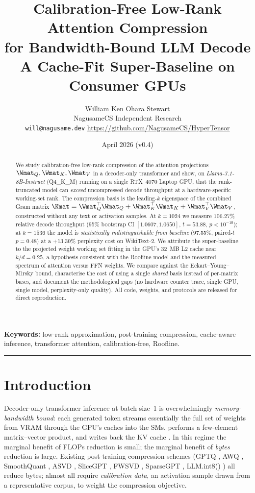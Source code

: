 \documentclass[11pt]{article}
\title{\textbf{Calibration-Free Low-Rank Attention Compression\\
for Bandwidth-Bound LLM Decode}\\[0.4em]
\large A Cache-Fit Super-Baseline on Consumer GPUs}
\author{William Ken Ohara Stewart\\
\small NagusameCS Independent Research\\
\small \texttt{will@nagusame.dev} \quad \url{https://github.com/NagusameCS/HyperTensor}}
\date{April 2026 (v0.4)}
\begin{document}
\maketitle
\hypertensorbanner

\begin{abstract}
\noindent
We study calibration-free low-rank compression of the attention projections
$\Wmat_Q,\Wmat_K,\Wmat_V$ in a decoder-only transformer and show, on
\textit{Llama-3.1-8B-Instruct} (Q4\_K\_M) running on a single RTX~4070 Laptop
GPU, that the rank-truncated model can \emph{exceed} uncompressed decode
throughput at a hardware-specific working-set rank.  The compression basis is
the leading-$k$ eigenspace of the combined Gram matrix
$\Kmat=\Wmat_Q^\top\Wmat_Q+\Wmat_K^\top\Wmat_K+\Wmat_V^\top\Wmat_V$,
constructed without any text or activation samples.  At
$k{=}1024$ we measure $106.27\%$ relative decode throughput
(95\% bootstrap CI $[1.0607,1.0650]$, $t{=}53.88$, $p<10^{-10}$);
at $k{=}1536$ the model is \emph{statistically indistinguishable from baseline}
(97.55\%, paired-$t$ $p{=}0.48$) at a +13.30\% perplexity cost on
WikiText-2.  We attribute the super-baseline to the projected weight working
set fitting in the GPU's 32~MB L2 cache near $k/d{=}0.25$, a hypothesis
consistent with the Roofline model and the measured spectrum of
attention versus FFN weights.  We compare against the Eckart--Young--Mirsky
bound, characterise the cost of using a single \emph{shared} basis instead of
per-matrix bases, and document the methodological gaps (no hardware counter
trace, single GPU, single model, perplexity-only quality).  All code, weights,
and protocols are released for direct reproduction.
\end{abstract}

\noindent\textbf{Keywords:} low-rank approximation, post-training compression,
cache-aware inference, transformer attention, calibration-free, Roofline.

\tableofcontents
\bigskip\hrule\bigskip

\section{Introduction}
\label{sec:intro}
Decoder-only transformer inference at batch size~1 is overwhelmingly
\emph{memory-bandwidth bound}: each generated token streams essentially the
full set of weights from VRAM through the GPU's caches into the SMs, performs
a few-element matrix--vector product, and writes back the KV cache
\cite{williams2009roofline,yuan2024llmroofline}.  In this regime the marginal
benefit of FLOPs reduction is small; the marginal benefit of \emph{bytes}
reduction is large.  Existing post-training compression schemes
(GPTQ \cite{frantar2022gptq}, AWQ \cite{lin2023awq}, SmoothQuant
\cite{xiao2022smoothquant}, ASVD \cite{yuan2023asvd},
SliceGPT \cite{ashkboos2024slicegpt}, FWSVD \cite{hsu2022fwsvd},
SparseGPT \cite{frantar2023sparsegpt}, LLM.int8() \cite{dettmers2022llmint8})
all reduce bytes; almost all require \emph{calibration data}, an activation
sample drawn from a representative corpus, to weight the compression
objective.
\end{document}

